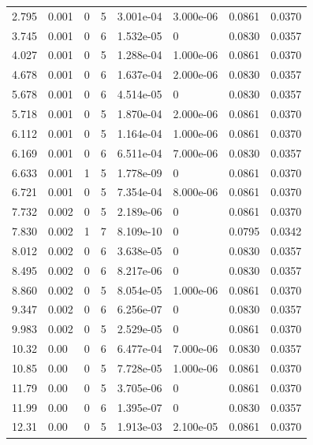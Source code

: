 \documentclass[preview]{standalone}
\begin{document}
{{\begin{tabular}{L{1.2cm}C{1.2cm} C{0.3cm}C{0.5cm} C{1.4cm}C{1.4cm} C{1.4cm}C{1.4cm}}
  2.795  &  0.001  & 0     &  5 &  3.001e-04  & 3.000e-06  & 0.0861 &  0.0370   \\ 
  3.745  &  0.001  & 0     &  6 &  1.532e-05  & 0  & 0.0830 &  0.0357   \\ 
  4.027  &  0.001  & 0     &  5 &  1.288e-04  & 1.000e-06  & 0.0861 &  0.0370   \\ 
  4.678  &  0.001  & 0     &  6 &  1.637e-04  & 2.000e-06  & 0.0830 &  0.0357   \\ 
  5.678  &  0.001  & 0     &  6 &  4.514e-05  & 0  & 0.0830 &  0.0357   \\ 
  5.718  &  0.001  & 0     &  5 &  1.870e-04  & 2.000e-06  & 0.0861 &  0.0370   \\ 
  6.112  &  0.001  & 0     &  5 &  1.164e-04  & 1.000e-06  & 0.0861 &  0.0370   \\ 
  6.169  &  0.001  & 0     &  6 &  6.511e-04  & 7.000e-06  & 0.0830 &  0.0357   \\ 
  6.633  &  0.001  & 1     &  5 &  1.778e-09  & 0  & 0.0861 &  0.0370   \\ 
  6.721  &  0.001  & 0     &  5 &  7.354e-04  & 8.000e-06  & 0.0861 &  0.0370   \\ 
  7.732  &  0.002  & 0     &  5 &  2.189e-06  & 0  & 0.0861 &  0.0370   \\ 
  7.830  &  0.002  & 1     &  7 &  8.109e-10  & 0  & 0.0795 &  0.0342   \\ 
  8.012  &  0.002  & 0     &  6 &  3.638e-05  & 0  & 0.0830 &  0.0357   \\ 
  8.495  &  0.002  & 0     &  6 &  8.217e-06  & 0  & 0.0830 &  0.0357   \\ 
  8.860  &  0.002  & 0     &  5 &  8.054e-05  & 1.000e-06  & 0.0861 &  0.0370   \\ 
  9.347  &  0.002  & 0     &  6 &  6.256e-07  & 0  & 0.0830 &  0.0357   \\ 
  9.983  &  0.002  & 0     &  5 &  2.529e-05  & 0  & 0.0861 &  0.0370   \\ 
  10.32  &  0.00  & 0     &  6 &  6.477e-04  & 7.000e-06  & 0.0830 &  0.0357   \\ 
  10.85  &  0.00  & 0     &  5 &  7.728e-05  & 1.000e-06  & 0.0861 &  0.0370   \\ 
  11.79  &  0.00  & 0     &  5 &  3.705e-06  & 0  & 0.0861 &  0.0370   \\ 
  11.99  &  0.00  & 0     &  6 &  1.395e-07  & 0  & 0.0830 &  0.0357   \\ 
  12.31  &  0.00  & 0     &  5 &  1.913e-03  & 2.100e-05  & 0.0861 &  0.0370   \\ 

\end{tabular}}}
\end{document}
